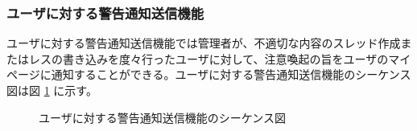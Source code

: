 \documentclass[a4j]{jarticle}
\begin{document}
  \subsubsection{ユーザに対する警告通知送信機能}
  ユーザに対する警告通知送信機能では管理者が、不適切な内容のスレッド作成またはレスの書き込みを度々行ったユーザに対して、注意喚起の旨をユーザのマイページに通知することができる。ユーザに対する警告通知送信機能のシーケンス図は図 \ref{fig:admin_user_warning.png} に示す。
  \begin{figure}[H]
    \centering
    \caption{ユーザに対する警告通知送信機能のシーケンス図}
    \label{fig:admin_user_warning.png}
  \end{figure}
\end{document}
